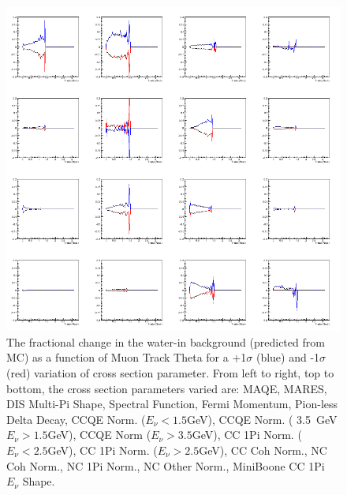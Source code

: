 \begin{figure}[H]
\centering
\includegraphics[width=5in]{Figures/TN100Plots/c_14_0.png}
\caption{The fractional change in the water-in background (predicted from MC) as a function of Muon Track Theta for a +1$\sigma$ (blue) and -1$\sigma$ (red) variation of cross section parameter. From left to right, top to bottom, the cross section parameters varied are: MAQE, MARES, DIS Multi-Pi Shape, Spectral Function, Fermi Momentum, Pion-less Delta Decay, CCQE Norm. ($E_\nu < 1.5$GeV), CCQE Norm. ( 3.5~GeV$E_\nu>1.5$GeV), CCQE Norm ($E_\nu > 3.5$GeV), CC 1Pi Norm. ($E_\nu < 2.5$GeV), CC 1Pi Norm. ($E_\nu > 2.5$GeV), CC Coh Norm., NC Coh Norm., NC 1Pi Norm., NC Other Norm., MiniBoone CC 1Pi $E_\nu$ Shape.}
\label{fig:xsvarTwB}
\end{figure}

